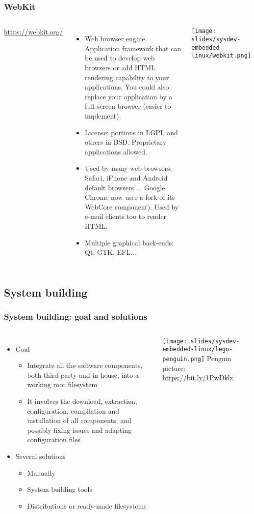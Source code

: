 \begin{frame}
  \frametitle{WebKit}
  \begin{columns}[T]
    \url{https://webkit.org/}
    \begin{itemize}
    \item Web browser engine. Application framework that can be used
      to develop web browsers or add HTML rendering capability to
      your applications. You could also replace your application
      by a full-screen browser (easier to implement).
    \item License: portions in LGPL and others in BSD. Proprietary
      applications allowed.
    \item Used by many web browsers: Safari, iPhone and Android default
      browsers ... Google Chrome now uses a fork of its WebCore component).
      Used by e-mail clients too to render HTML.
    \item Multiple graphical back-ends: Qt, GTK, EFL...
    \end{itemize}
    \texttt{[image: slides/sysdev-embedded-linux/webkit.png]}
  \end{columns}
\end{frame}

\subsection{System building}

\begin{frame}
  \frametitle{System building: goal and solutions}
  \begin{columns}
    \begin{itemize}
    \item Goal
      \begin{itemize}
      \item Integrate all the software components, both third-party and
        in-house, into a working root filesystem
      \item It involves the download, extraction, configuration,
        compilation and installation of all components, and possibly
        fixing issues and adapting configuration files
      \end{itemize}
    \item Several solutions
      \begin{itemize}
      \item Manually
      \item System building tools
      \item Distributions or ready-made filesystems
      \end{itemize}
    \end{itemize}
    \texttt{[image: slides/sysdev-embedded-linux/lego-penguin.png]}
    \vfill
    {\tiny Penguin picture: \url{https://bit.ly/1PwDklz}}
  \end{columns}
\end{frame}

